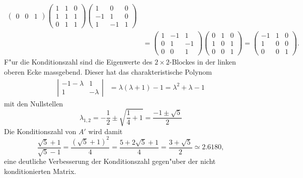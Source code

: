 \begin{loesung}
\begin{align*}
\begin{pmatrix}
 0& 0& 1
\end{pmatrix}
\begin{pmatrix}
1&1&0\\
1&1&1\\
0&1&1
\end{pmatrix}
\begin{pmatrix}
 1& 0& 0\\
-1& 1& 0\\
 1&-1& 1
\end{pmatrix}
\\
&=
\begin{pmatrix}
 1&-1& 1\\
 0& 1&-1\\
 0& 0& 1
\end{pmatrix}
\begin{pmatrix}
0&1&0\\
1&0&1\\
0&0&1
\end{pmatrix}
=
\begin{pmatrix}
-1&1&0\\
 1&0&0\\
 0&0&1
\end{pmatrix}.
\end{align*}
F"ur die Konditionszahl sind die Eigenwerte des $2\times 2$-Blockes in der
linken oberen Ecke massgebend. Dieser hat das charakteristische
Polynom
\begin{align*}
\left|\begin{matrix}
-1-\lambda&1\\
         1&-\lambda
\end{matrix}\right|
&=
\lambda(\lambda+1)-1=\lambda^2+\lambda-1
\end{align*}
mit den Nullstellen
\[
\lambda_{1,2}=-\frac12\pm\sqrt{\frac14+1}=\frac{-1\pm\sqrt{5}}2
\]
Die Konditionszahl von $A'$ wird damit
\[
\frac{\sqrt{5}+1}{\sqrt{5}-1}=\frac{(\sqrt{5}+1)^2}{4}
=\frac{5+2\sqrt{5}+1}4=\frac{3+\sqrt{5}}2\simeq2.6180,
\]
eine deutliche Verbesserung der Konditionszahl gegen"uber der nicht 
konditionierten Matrix.
\end{loesung}


